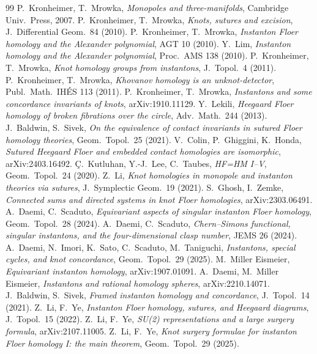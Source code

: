 \begin{thebibliography}{99}
 P.~Kronheimer, T.~Mrowka, \emph{Monopoles and three-manifolds}, Cambridge Univ.\ Press, 2007.
 P.~Kronheimer, T.~Mrowka, \emph{Knots, sutures and excision}, J.\ Differential Geom.\ 84 (2010).
 P.~Kronheimer, T.~Mrowka, \emph{Instanton Floer homology and the Alexander polynomial}, AGT 10 (2010).
 Y.~Lim, \emph{Instanton homology and the Alexander polynomial}, Proc.\ AMS 138 (2010).
 P.~Kronheimer, T.~Mrowka, \emph{Knot homology groups from instantons}, J.\ Topol.\ 4 (2011).
 P.~Kronheimer, T.~Mrowka, \emph{Khovanov homology is an unknot-detector}, Publ.\ Math.\ IH\'ES 113 (2011).
 P.~Kronheimer, T.~Mrowka, \emph{Instantons and some concordance invariants of knots}, arXiv:1910.11129.
 Y.~Lekili, \emph{Heegaard Floer homology of broken fibrations over the circle}, Adv.\ Math.\ 244 (2013).
 J.~Baldwin, S.~Sivek, \emph{On the equivalence of contact invariants in sutured Floer homology theories}, Geom.\ Topol.\ 25 (2021).
 V.~Colin, P.~Ghiggini, K.~Honda, \emph{Sutured Heegaard Floer and embedded contact homologies are isomorphic}, arXiv:2403.16492.
 \c{C}.~Kutluhan, Y.-J.~Lee, C.~Taubes, \emph{HF=HM I--V}, Geom.\ Topol.\ 24 (2020).
 Z.~Li, \emph{Knot homologies in monopole and instanton theories via sutures}, J.\ Symplectic Geom.\ 19 (2021).
 S.~Ghosh, I.~Zemke, \emph{Connected sums and directed systems in knot Floer homologies}, arXiv:2303.06491.
 A.~Daemi, C.~Scaduto, \emph{Equivariant aspects of singular instanton Floer homology}, Geom.\ Topol.\ 28 (2024).
 A.~Daemi, C.~Scaduto, \emph{Chern--Simons functional, singular instantons, and the four-dimensional clasp number}, JEMS 26 (2024).
 A.~Daemi, N.~Imori, K.~Sato, C.~Scaduto, M.~Taniguchi, \emph{Instantons, special cycles, and knot concordance}, Geom.\ Topol.\ 29 (2025).
 M.~Miller Eismeier, \emph{Equivariant instanton homology}, arXiv:1907.01091.
 A.~Daemi, M.~Miller Eismeier, \emph{Instantons and rational homology spheres}, arXiv:2210.14071.
 J.~Baldwin, S.~Sivek, \emph{Framed instanton homology and concordance}, J.\ Topol.\ 14 (2021).
 Z.~Li, F.~Ye, \emph{Instanton Floer homology, sutures, and Heegaard diagrams}, J.\ Topol.\ 15 (2022).
 Z.~Li, F.~Ye, \emph{SU(2) representations and a large surgery formula}, arXiv:2107.11005.
 Z.~Li, F.~Ye, \emph{Knot surgery formulae for instanton Floer homology I: the main theorem}, Geom.\ Topol.\ 29 (2025).

\end{thebibliography}
